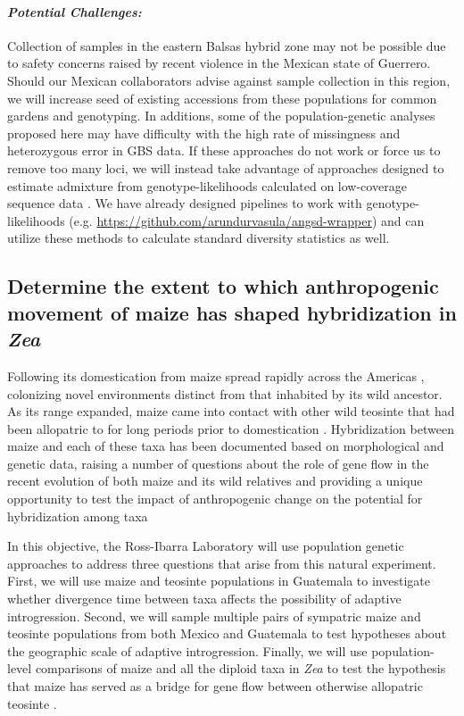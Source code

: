 \paragraph{\emph{Potential Challenges:}}
Collection of samples in the eastern Balsas hybrid zone may not be possible due to safety concerns raised by recent violence in the Mexican state of Guerrero.
Should our Mexican collaborators advise against sample collection in this region, we will increase seed of existing accessions from these populations for common gardens and genotyping.
In additions, some of the population-genetic analyses proposed here may have difficulty with the high rate of missingness and heterozygous error in GBS data.
If these approaches do not work or force us to remove too many loci, we will instead take advantage of approaches designed  to estimate admixture from genotype-likelihoods calculated on low-coverage sequence data \citep{skotte2013estimating}. 
We have already designed pipelines to work with genotype-likelihoods (e.g. \url{https://github.com/arundurvasula/angsd-wrapper}) and can utilize these methods to calculate standard diversity statistics as well.  

\subsection{Determine the extent to which anthropogenic movement of maize has shaped hybridization in \emph{Zea} } 
\label{ss:genuswide}
Following its domestication from \zp{} maize spread rapidly across the Americas \citep{Piperno2001,Grobman2012}, colonizing novel environments distinct from that inhabited by its wild ancestor. 
As its range expanded, maize came into contact with other wild teosinte that had been allopatric to \zp{} for long periods prior to domestication \citep{hufford2012inferences}.  
Hybridization between maize and each of these taxa has been documented based on morphological \citep{wilkes1967teosinte, Wilkes1977} and genetic \citep{doebley1990molecular,Fukunaga2005,Ross-Ibarra2009a,vanheerwaarden2011a} data, raising a number of questions about the role of gene flow in the recent evolution of both maize and its wild relatives and providing a unique opportunity to test the impact of anthropogenic change on the potential for hybridization among taxa \citep{Anderson1954}

In this objective, the Ross-Ibarra Laboratory will use population genetic approaches to address three questions that arise from this natural experiment.  
First, we will use maize and teosinte populations in Guatemala to investigate whether divergence time between taxa affects the possibility of adaptive introgression. 
Second, we will sample multiple pairs of sympatric maize and teosinte populations from both Mexico and Guatemala to test hypotheses about the geographic scale of adaptive introgression.
Finally, we will use population-level comparisons of maize and all the diploid taxa in \emph{Zea} to test the hypothesis that maize has served as a bridge for gene flow between otherwise allopatric teosinte \citep{Ross-Ibarra2009a}.

